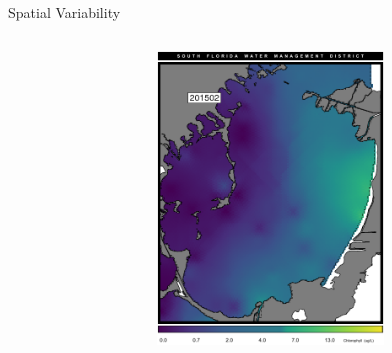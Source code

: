 \documentclass[compress,noflama,nosectionpages]{beamer}
\begin{document}
		\begin{frame}{Spatial Variability}
		\vspace{-2em}
		\begin{columns}
		\begin{column}{6cm}
			\begin{center}
			\\
			\end{center}
		\end{column}
		\begin{column}{6cm}
			\begin{center}
			\includegraphics[height=7.8cm,keepaspectratio=true,trim= 0mm 0mm 0mm 9mm,clip=TRUE]{figures/barnes_chl.png}\\
			\end{center}
		\end{column}
		\end{columns}
		
		\end{frame}
\end{document}
